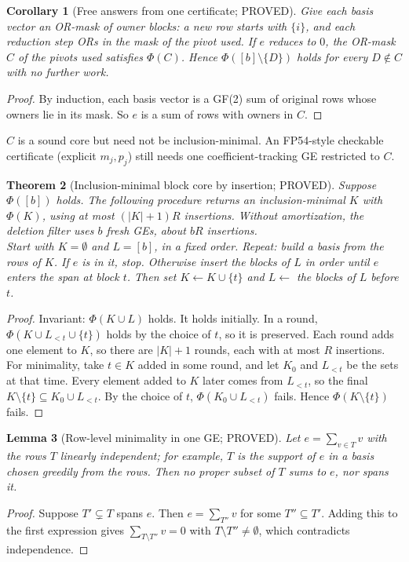 \documentclass[11pt]{article}
\newtheorem{theorem}{Theorem}
\newtheorem{lemma}[theorem]{Lemma}
\newtheorem{corollary}[theorem]{Corollary}
\theoremstyle{definition}
\begin{document}
\begin{corollary}[Free answers from one certificate; PROVED]\label{cor:skip}
Give each basis vector an OR-mask of owner blocks: a new row starts with $\{i\}$, and each reduction step ORs in the mask of the pivot used. If $e$ reduces to $0$, the OR-mask $C$ of the pivots used satisfies $\Phi(C)$. Hence $\Phi([b]\setminus\{D\})$ holds for every $D\notin C$ with no further work.
\end{corollary}
\begin{proof}
By induction, each basis vector is a GF(2) sum of original rows whose owners lie in its mask. So $e$ is a sum of rows with owners in $C$.
\end{proof}
\noindent $C$ is a sound core but need not be inclusion-minimal. An FP54-style checkable certificate (explicit $m_j,p_j$) still needs one coefficient-tracking GE restricted to $C$.

\begin{theorem}[Inclusion-minimal block core by insertion; PROVED]\label{thm:ins}
Suppose $\Phi([b])$ holds. The following procedure returns an inclusion-minimal $K$ with $\Phi(K)$, using at most $(|K|+1)R$ insertions. Without amortization, the deletion filter uses $b$ fresh GEs, about $bR$ insertions.\\
Start with $K=\emptyset$ and $L=[b]$, in a fixed order. Repeat: build a basis from the rows of $K$. If $e$ is in it, stop. Otherwise insert the blocks of $L$ in order until $e$ enters the span at block $t$. Then set $K\leftarrow K\cup\{t\}$ and $L\leftarrow$ the blocks of $L$ before $t$.
\end{theorem}
\begin{proof}
Invariant: $\Phi(K\cup L)$ holds. It holds initially. In a round, $\Phi(K\cup L_{<t}\cup\{t\})$ holds by the choice of $t$, so it is preserved. Each round adds one element to $K$, so there are $|K|+1$ rounds, each with at most $R$ insertions. For minimality, take $t\in K$ added in some round, and let $K_0$ and $L_{<t}$ be the sets at that time. Every element added to $K$ later comes from $L_{<t}$, so the final $K\setminus\{t\}\subseteq K_0\cup L_{<t}$. By the choice of $t$, $\Phi(K_0\cup L_{<t})$ fails. Hence $\Phi(K\setminus\{t\})$ fails.
\end{proof}

\begin{lemma}[Row-level minimality in one GE; PROVED]\label{lem:row}
Let $e=\sum_{v\in T}v$ with the rows $T$ linearly independent; for example, $T$ is the support of $e$ in a basis chosen greedily from the rows. Then no proper subset of $T$ sums to $e$, nor spans it.
\end{lemma}
\begin{proof}
Suppose $T'\subsetneq T$ spans $e$. Then $e=\sum_{T''}v$ for some $T''\subseteq T'$. Adding this to the first expression gives $\sum_{T\setminus T''}v=0$ with $T\setminus T''\neq\emptyset$, which contradicts independence.
\end{proof}
\end{document}
